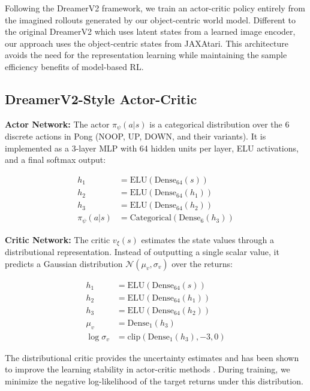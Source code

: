 \documentclass[
	english,
	ruledheaders=section,
	class=report,
	thesis={type=master},
	accentcolor=9c,
	custommargins=true,
	marginpar=false,
	parskip=half-,
	fontsize=11pt,
	pdfa=true,
]{tudapub}
\newcommand{\worldmodel}{world model}
\begin{document}
Following the DreamerV2 framework, we train an actor-critic policy entirely
from the imagined rollouts generated by our object-centric \worldmodel{}.
Different to the original DreamerV2 which uses latent states from a learned
image encoder, our approach uses the object-centric states from JAXAtari. This
architecture avoids the need for the representation learning while maintaining
the sample efficiency benefits of model-based RL.

\subsection{DreamerV2-Style Actor-Critic}
\label{subsec:dreamer_ac}

\textbf{Actor Network:} The actor $\pi_\psi(a|s)$ is a categorical distribution over the 6 discrete actions in Pong (NOOP, UP, DOWN, and their variants). It is implemented as a 3-layer MLP with 64 hidden units per layer, ELU activations, and a final softmax output:

\begin{align}
	h_1           & = \text{ELU}(\text{Dense}_{64}(s))        \\
	h_2           & = \text{ELU}(\text{Dense}_{64}(h_1))      \\
	h_3           & = \text{ELU}(\text{Dense}_{64}(h_2))      \\
	\pi_\psi(a|s) & = \text{Categorical}(\text{Dense}_6(h_3))
\end{align}

\textbf{Critic Network:} The critic $v_\xi(s)$ estimates the state values through a distributional representation. Instead of outputting a single scalar value, it predicts a Gaussian distribution $\mathcal{N}(\mu_v, \sigma_v)$ over the returns:

\begin{align}
	h_1           & = \text{ELU}(\text{Dense}_{64}(s))        \\
	h_2           & = \text{ELU}(\text{Dense}_{64}(h_1))      \\
	h_3           & = \text{ELU}(\text{Dense}_{64}(h_2))      \\
	\mu_v         & = \text{Dense}_1(h_3)                     \\
	\log \sigma_v & = \text{clip}(\text{Dense}_1(h_3), -3, 0)
\end{align}

The distributional critic provides the uncertainty estimates and has been shown
to improve the learning stability in actor-critic methods \cite{DBLP:conf/nips/YueWZ20}.
During training, we minimize the negative log-likelihood of the target returns
under this distribution.
\end{document}
